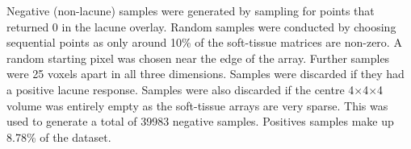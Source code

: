
Negative (non-lacune) samples were generated by sampling for points that returned 0 in the lacune overlay. Random samples were conducted by choosing sequential points as only around 10\% of the soft-tissue matrices are non-zero. A random starting pixel was chosen near the edge of the array. Further samples were 25 voxels apart in all three dimensions. Samples were discarded if they had a positive lacune response. Samples were also discarded if the centre 4$\times$4$\times$4 volume was entirely empty as the soft-tissue arrays are very sparse. This was used to generate a total of 39983 negative samples. Positives samples make up 8.78\% of the dataset.


%
%
%
%

%
%
%
%
%
%
%
%
%



%